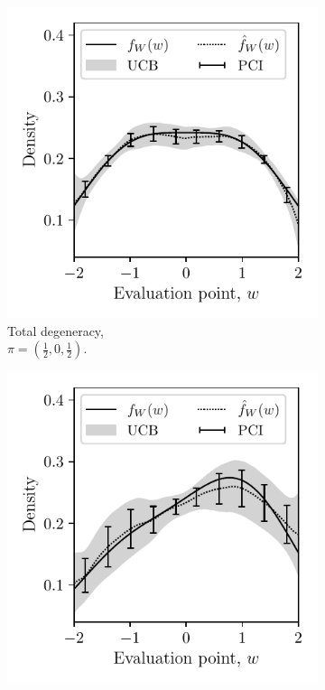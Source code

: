\begin{figure}[t]
  \centering
  \begin{subfigure}{0.32\textwidth}
    \centering
    \includegraphics[scale=0.64]{graphics/outcome_plot_total.pdf}
    \caption{Total degeneracy, \\
    $\pi = \left( \frac{1}{2}, 0, \frac{1}{2} \right)$.}
  \end{subfigure}
  \begin{subfigure}{0.32\textwidth}
    \centering
    \includegraphics[scale=0.64]{graphics/outcome_plot_partial.pdf}

\end{subfigure}
\end{figure}
